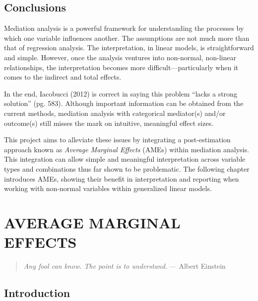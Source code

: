 \documentclass[]{DissertateUSU}
\begin{document}
\section{Conclusions}\label{conclusions}

Mediation analysis is a powerful framework for understanding the
processes by which one variable influences another. The assumptions are
not much more than that of regression analysis. The interpretation, in
linear models, is straightforward and simple. However, once the analysis
ventures into non-normal, non-linear relationships, the interpretation
becomes more difficult---particularly when it comes to the indirect and
total effects.

In the end, Iacobucci (2012) is correct in saying this problem ``lacks a
strong solution'' (pg. 583). Although important information can be
obtained from the current methods, mediation analysis with categorical
mediator(s) and/or outcome(s) still misses the mark on intuitive,
meaningful effect sizes.

This project aims to alleviate these issues by integrating a
post-estimation approach known as \emph{Average Marginal Effects} (AMEs)
within mediation analysis. This integration can allow simple and
meaningful interpretation across variable types and combinations thus
far shown to be problematic. The following chapter introduces AMEs,
showing their benefit in interpretation and reporting when working with
non-normal variables within generalized linear models.

\singlespacing

\FloatBarrier

\newpage

 \fancyhead[R]{\thepage}
\fancyfoot[C]{}

\chapter{AVERAGE MARGINAL EFFECTS}

\begin{quote}
\emph{Any fool can know. The point is to understand.}
--- Albert Einstein
\end{quote}

\doublespacing

\section{Introduction}\label{introduction-1}
\end{document}

